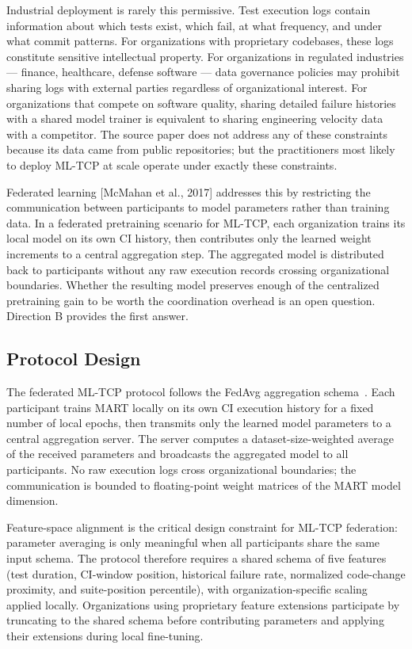 \documentclass[conference]{IEEEtran}
\begin{document}
Industrial deployment is rarely this permissive. Test execution logs contain information about which tests exist, which fail, at what frequency, and under what commit patterns. For organizations with proprietary codebases, these logs constitute sensitive intellectual property. For organizations in regulated industries — finance, healthcare, defense software — data governance policies may prohibit sharing logs with external parties regardless of organizational interest. For organizations that compete on software quality, sharing detailed failure histories with a shared model trainer is equivalent to sharing engineering velocity data with a competitor. The source paper does not address any of these constraints because its data came from public repositories; but the practitioners most likely to deploy ML-TCP at scale operate under exactly these constraints.


Federated learning [McMahan et al., 2017] addresses this by restricting the communication between participants to model parameters rather than training data. In a federated pretraining scenario for ML-TCP, each organization trains its local model on its own CI history, then contributes only the learned weight increments to a central aggregation step. The aggregated model is distributed back to participants without any raw execution records crossing organizational boundaries. Whether the resulting model preserves enough of the centralized pretraining gain to be worth the coordination overhead is an open question. Direction B provides the first answer.


\subsection{Protocol Design}

The federated ML-TCP protocol follows the FedAvg aggregation schema~\cite{mcmahan2017}. Each participant trains MART locally on its own CI execution history for a fixed number of local epochs, then transmits only the learned model parameters to a central aggregation server. The server computes a dataset-size-weighted average of the received parameters and broadcasts the aggregated model to all participants. No raw execution logs cross organizational boundaries; the communication is bounded to floating-point weight matrices of the MART model dimension.

Feature-space alignment is the critical design constraint for ML-TCP federation: parameter averaging is only meaningful when all participants share the same input schema. The protocol therefore requires a shared schema of five features (test duration, CI-window position, historical failure rate, normalized code-change proximity, and suite-position percentile), with organization-specific scaling applied locally. Organizations using proprietary feature extensions participate by truncating to the shared schema before contributing parameters and applying their extensions during local fine-tuning.
\end{document}
